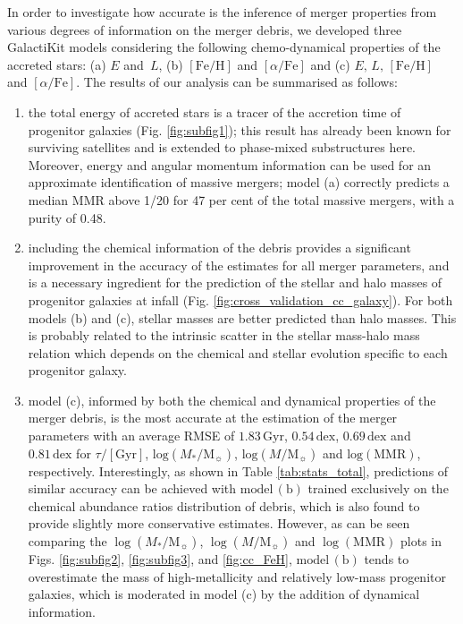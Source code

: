 In order to investigate how accurate is the inference of merger properties from various degrees of information on the merger debris, we developed three GalactiKit models considering the following chemo-dynamical properties of the accreted stars: (a) $E$ and $\,L$, (b) $[\text{Fe}/\text{H}]$ and $[\alpha/\text{Fe}]$ and (c) $E, \, L, \, [\text{Fe}/\text{H}]$ and $[\alpha/\text{Fe}]$. The results of our analysis can be summarised as follows:

\begin{enumerate}
    \item the total energy of accreted stars is a tracer of the accretion time of progenitor galaxies (Fig. \ref{fig:subfig1}); this result has already been known for surviving satellites \citep{Rocha2012} and is extended to phase-mixed substructures here. Moreover, energy and angular momentum information can be used for an approximate identification of massive mergers; model (a) correctly predicts a median MMR above 1/20 for 47 per cent of the total massive mergers, with a purity of 0.48.
    \item including the chemical information of the debris provides a significant improvement in the accuracy of the estimates for all merger parameters, and is a necessary ingredient for the prediction of the stellar and halo masses of progenitor galaxies at infall (Fig. \ref{fig:cross_validation_cc_galaxy}). For both models (b) and (c), stellar masses are better predicted than halo masses. This is probably related to the intrinsic scatter in the stellar mass-halo mass relation which depends on the chemical and stellar evolution specific to each progenitor galaxy. 
    \item model (c), informed by both the chemical and dynamical properties of the merger debris, is the most accurate at the estimation of the merger parameters with an average RMSE of $1.83\,\mathrm{Gyr}$, $0.54\,\mathrm{dex}$, $0.69\,\mathrm{dex}$ and $0.81 \, \mathrm{dex}$ for $\tau/[\mathrm{Gyr}]$, $\mathrm{log}(M_{*}/\mathrm{M}_{\sun})$,  $\mathrm{log}(M/\mathrm{M}_{\sun})$ and $\mathrm{log}(\mathrm{MMR})$, respectively. Interestingly, as shown in Table \ref{tab:stats_total}, predictions of similar accuracy can be achieved with $\mathrm{model}\, (\mathrm{b})$ trained exclusively on the chemical abundance ratios distribution of debris, which is also found to provide slightly more conservative estimates. However, as can be seen comparing the $\log(M_*/\mathrm{M}_{\sun})$, $\log(M/\mathrm{M}_{\sun})$ and $\log(\mathrm{MMR})$ plots in Figs. \ref{fig:subfig2}, \ref{fig:subfig3}, and \ref{fig:cc_FeH}, $\mathrm{model}\, (\mathrm{b})$ tends to overestimate the mass of high-metallicity and relatively low-mass progenitor galaxies, which is moderated in model (c) by the addition of dynamical information.

\end{enumerate}
